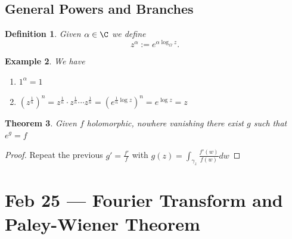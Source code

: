 \documentclass[a4paper]{article}
\newtheorem{thm}{Theorem}[section]
\newtheorem{defn}[thm]{Definition}
\newtheorem{eg}[thm]{Example}
\begin{document}
\subsection{General Powers and Branches}
\begin{defn}
    Given $\alpha\in \C$ we define \[
    z^\alpha := e^{\alpha \log_\Omega z}
    .\] 
\end{defn}
\begin{eg}
    We have 
    \begin{enumerate}
        \item $1^\alpha =1$
        \item $ \left( z^{ \frac{1}{n}} \right)^n=z^{ \frac{1}{n}}\cdot z^{ \frac{1}{n}}\cdots z^{ \frac{1}{n}}= \left( e^{ \frac{1}{n}\log z} \right)^n=e^{\log z}=z$
    \end{enumerate}
\end{eg}
\begin{thm}
    Given $f$ holomorphic, nowhere vanishing there exist $g$ such that  $e^g=f$ 
\end{thm}
\begin{proof}
    Repeat the previous $g'= \frac{f'}{f}$ with $g(z)=\int_{\gamma_z} \frac{f'(w)}{f(w)}dw$
     
\end{proof}
\newpage
\section{Feb 25 --- Fourier Transform and Paley-Wiener Theorem}
\end{document}
